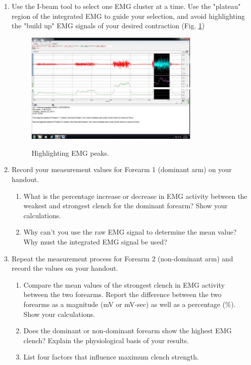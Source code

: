 \documentclass{article}
\begin{document}
\begin{enumerate}
	\item Use the I-beam tool to select one EMG cluster at a time. Use the "plateau" region of the integrated EMG to guide your selection, and avoid highlighting the "build up" EMG signals of your desired contraction (Fig. \ref{highlighting})
		\begin{figure}[h]
	\includegraphics[width=0.8\textwidth]{../images/EMG_I_11a.jpg}	\includegraphics[width=0.8\textwidth]{../images/EMG_I_11b.jpg}
		\centering
		\caption{Highlighting EMG peaks.}
		\label{highlighting}
		\end{figure}
	
	\item Record your measurement values for Forearm 1 (dominant arm) on your handout.
	\begin{enumerate}
		\item What is the percentage increase or decrease in EMG activity between the weakest and strongest clench for the dominant forearm? Show your calculations.
		\item Why can't you use the raw EMG signal to determine the mean value? Why must the integrated EMG signal be used?
	\end{enumerate}
	\item Repeat the measurement process for Forearm 2 (non-dominant arm) and record the values on your handout.
	\begin{enumerate}
		\item Compare the mean values of the strongest clench in EMG activity between the two forearms. Report the difference between the two forearms as a magnitude (mV or mV-sec) as well as a percentage (\%). Show your calculations.
		\item Does the dominant or non-dominant forearm show the highest EMG clench? Explain the physiological basis of your results.
		\item List four factors that influence maximum clench strength.
	\end{enumerate}
	

\end{enumerate}
\end{document}
